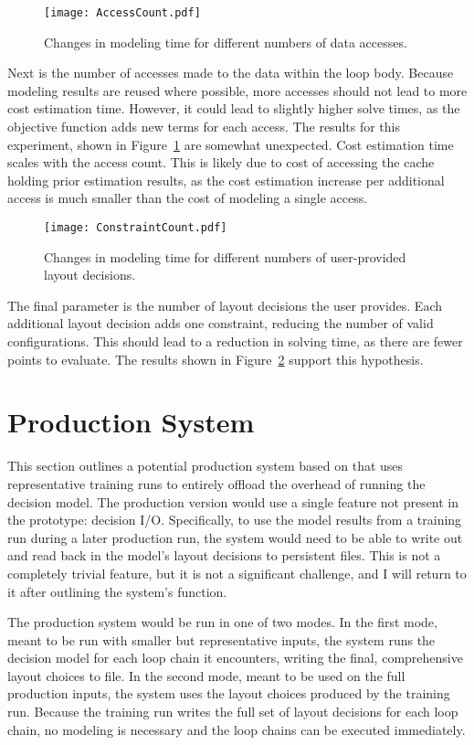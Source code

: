 \begin{figure}
	\centering
	\texttt{[image: AccessCount.pdf]}
	\caption{Changes in modeling time for different numbers of data accesses.}\label{AccessCount}
\end{figure}
Next is the number of accesses made to the data within the loop body.
Because modeling results are reused where possible, more accesses should not lead to more cost estimation time. 
However, it could lead to slightly higher solve times, as the objective function adds new terms for each access.
The results for this experiment, shown in Figure~\ref{AccessCount} are somewhat unexpected.
Cost estimation time scales with the access count.
This is likely due to cost of accessing the cache holding prior estimation results, as the cost estimation increase per additional access is much smaller than the cost of modeling a single access.

\begin{figure}
	\centering
	\texttt{[image: ConstraintCount.pdf]}
	\caption{Changes in modeling time for different numbers of user-provided layout decisions.}\label{ConstraintCount}
\end{figure}

The final parameter is the number of layout decisions the user provides. 
Each additional layout decision adds one constraint, reducing the number of valid configurations. 
This should lead to a reduction in solving time, as there are fewer points to evaluate.
The results shown in Figure~\ref{ConstraintCount} support this hypothesis.

\section{Production System}

This section outlines a potential production system based on \FormatDecisions{} that uses representative training runs to entirely offload the overhead of running the decision model.
The production version would use a single feature not present in the prototype: decision I/O.
Specifically, to use the model results from a training run during a later production run, the system would need to be able to write out and read back in the model's layout decisions to persistent files.
This is not a completely trivial feature, but it is not a significant challenge, and I will return to it after outlining the system's function.

The production system would be run in one of two modes.
In the first mode, meant to be run with smaller but representative inputs, the system runs the decision model for each loop chain it encounters, writing the final, comprehensive layout choices to file.
In the second mode, meant to be used on the full production inputs, the system uses the layout choices produced by the training run.
Because the training run writes the full set of layout decisions for each loop chain, no modeling is necessary and the loop chains can be executed immediately.

